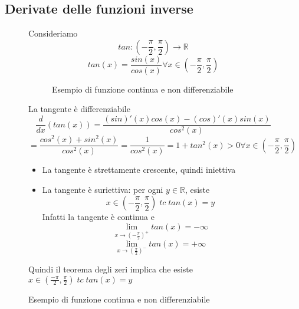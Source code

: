 \documentclass[a4paper]{article}
\theoremstyle{break}
\theoremstyle{break}
\theoremstyle{break}
\theoremstyle{break}
\begin{document}
\subsection{Derivate delle funzioni inverse}
\begin{figure}[H]
  \begin{example}
    Consideriamo
    \[
    tan: (-\frac{\pi}{2}, \frac{\pi}{2}) \to \mathbb{R}
    \] 
    \[
    tan(x) = \frac{sin(x)}{cos(x)} \forall x \in (-\frac{\pi}{2}, \frac{\pi}{2})
    \] 
 		\begin{figure}[H]
			\begin{center}
			\end{center}
      \caption{Esempio di funzione continua e non differenziabile}
		\end{figure}

    La tangente è differenziabile
    \[
      \frac{d}{dx}(tan(x)) = \frac{(sin)'(x)cos(x)-(cos)'(x)sin(x)}{cos^2(x)}
    \] 
    \[
    =\frac{cos^2(x)+sin^2(x)}{cos^2(x)} = \frac{1}{cos^2(x)} = 1+tan^2(x) > 0 \forall x \in (-\frac{\pi}{2}, \frac{\pi}{2})
    \] 
    \begin{itemize}
      \item 
        La tangente è strettamente crescente, quindi iniettiva
      \item La tangente è suriettiva: per ogni \( y \in \mathbb{R} \), esiste \[
      x \in (-\frac{\pi}{2}, \frac{\pi}{2}) \;tc\; tan(x)=y
      \] 
      Infatti la tangente è continua e 
      \[
      \lim_{x \to (-\frac{\pi}{2})^+} tan(x) = -\infty
      \] 
      \[
      \lim_{x \to (\frac{\pi}{2})^-} tan(x) = +\infty
      \] 
    \end{itemize}
    Quindi il teorema degli zeri implica che esiste \( x \in (\frac{-\pi}{2}, \frac{\pi}{2})\;tc\; tan(x)=y \)
  \end{example}
\end{figure}
\end{document}
